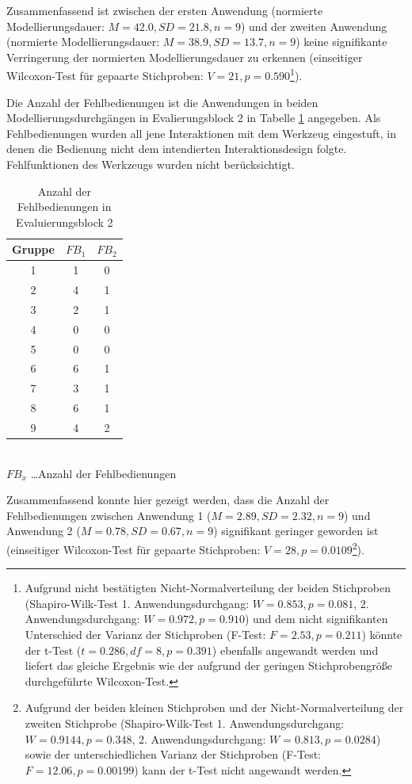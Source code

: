 Zusammenfassend ist zwischen der ersten Anwendung (normierte Modellierungsdauer: $M=42.0, SD=21.8, n=9$) und der zweiten Anwendung (normierte Modellierungsdauer: $M=38.9, SD=13.7, n=9$) keine signifikante Verringerung der normierten Modellierungsdauer zu erkennen (einseitiger Wilcoxon-Test für gepaarte Stichproben: $V=21, p=0.590$\footnote{Aufgrund nicht bestätigten Nicht-Normalverteilung der beiden Stichproben (Shapiro-Wilk-Test 1. Anwendungsdurchgang: $W=0.853, p=0.081$, 2. Anwendungsdurchgang: $W=0.972, p=0.910$) und dem nicht signifikanten Unterschied der Varianz der Stichproben (F-Test: $F=2.53, p=0.211$) könnte der t-Test ($t=0.286, df=8, p=0.391$) ebenfalls angewandt werden und liefert das gleiche Ergebnis wie der aufgrund der geringen Stichprobengröße durchgeführte Wilcoxon-Test.}).

Die Anzahl der Fehlbedienungen ist die Anwendungen in beiden Modellierungsdurchgängen in Evalierungsblock 2 in Tabelle \ref{tab:fehlbedienungen} angegeben. Als Fehlbedienungen wurden all jene Interaktionen mit dem Werkzeug eingestuft, in denen die Bedienung nicht dem intendierten Interaktionsdesign folgte. Fehlfunktionen des Werkzeugs wurden nicht berücksichtigt.

\begin{table}[htbp]
	\centering
	\caption{Anzahl der Fehlbedienungen in Evaluierungsblock 2}
\begin{tabular}{| c || c | c |}
  \hline
   Gruppe    & $FB_{1}$ & $FB_{2}$ \\ \hline
   1     & 1 & 0 \\ 
   2     & 4 & 1 \\ 
   3     & 2 & 1 \\ 
   4     & 0 & 0 \\ 
   5     & 0 & 0 \\ 
   6     & 6 & 1 \\ 
   7     & 3 & 1 \\ 
   8     & 6 & 1 \\ 
   9     & 4 & 2 \\ \hline
\end{tabular} \\
\footnotesize $FB_{x}$ \ldots Anzahl der Fehlbedienungen
	\label{tab:fehlbedienungen}
\end{table}

Zusammenfassend konnte hier gezeigt werden, dass die Anzahl der Fehlbedienungen zwischen Anwendung 1 ($M=2.89, SD=2.32, n=9$) und Anwendung 2 ($M=0.78, SD=0.67, n=9$) signifikant geringer geworden ist (einseitiger Wilcoxon-Test für gepaarte Stichproben: $V=28, p=0.0109$\footnote{Aufgrund der beiden kleinen Stichproben und der Nicht-Normalverteilung der zweiten Stichprobe (Shapiro-Wilk-Test 1. Anwendungsdurchgang: $W=0.9144, p=0.348$, 2. Anwendungsdurchgang: $W=0.813, p=0.0284$) sowie der unterschiedlichen Varianz der Stichproben (F-Test: $F=12.06, p=0.00199$) kann der t-Test nicht angewandt werden.}).

